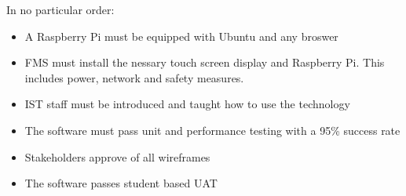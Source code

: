 	In no particular order:
\begin{itemize}
	\item A Raspberry Pi must be equipped with Ubuntu and any broswer
	\item FMS must install the nessary touch screen display and Raspberry Pi. This includes power, network and safety measures.
	\item IST staff must be introduced and taught how to use the technology
	\item The software must pass unit and performance testing with a 95\% success rate
	\item Stakeholders approve of all wireframes
	\item The software passes student based UAT
	
\end{itemize}